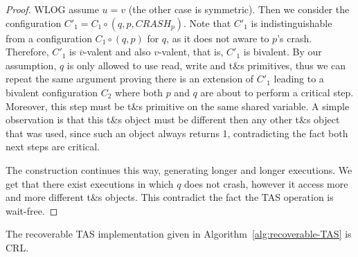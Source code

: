 \begin{proof}
	WLOG assume $u=v$ (the other case is symmetric). Then we consider the configuration $C'_1 = C_1 \circ (q,p,CRASH_p)$. Note that $C'_1$ is indistinguishable from a configuration $C_1 \circ (q,p)$ for $q$, as it does not aware to $p$'s crash. Therefore, $C'_1$ is $\overline{v}$-valent and also $v$-valent, that is, $C'_1$ is bivalent. By our assumption, $q$ is only allowed to use read, write and t\&s primitives, thus we can repeat the same argument proving there is an extension of $C'_1$ leading to a bivalent configuration $C_2$ where both $p$ and $q$ are about to perform a critical step. Moreover, this step must be t\&s primitive on the same shared variable. A simple observation is that this t\&s object must be different then any other t\&s object that was used, since such an object always returns 1, contradicting the fact both next steps are critical.
	
	The construction continues this way, generating longer and longer executions. We get that there exist executions in which $q$ does not crash, however it access more and more different t\&s objects. This contradict the fact the TAS operation is wait-free.
\end{proof}




\begin{claim}
	The recoverable TAS implementation given in Algorithm~\ref{alg:recoverable-TAS} is CRL.
\end{claim}

